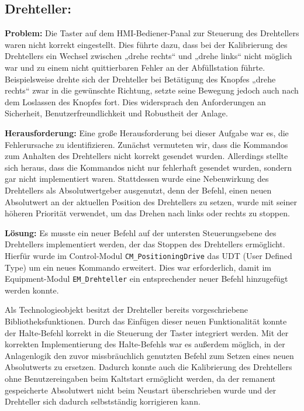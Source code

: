 \subsection{Drehteller:} 

\textbf{Problem:}  
Die Taster auf dem HMI-Bediener-Panal zur Steuerung des Drehtellers waren nicht korrekt eingestellt. Dies führte dazu, dass bei der Kalibrierung des Drehtellers ein 
Wechsel zwischen „drehe rechts“ und „drehe links“ nicht möglich war und zu einem nicht quittierbaren Fehler an der Abfüllstation führte. 
Beispielsweise drehte sich der Drehteller bei Betätigung des Knopfes „drehe rechts“ zwar in die gewünschte Richtung, setzte seine Bewegung 
jedoch auch nach dem Loslassen des Knopfes fort. Dies widersprach den Anforderungen an Sicherheit, Benutzerfreundlichkeit und Robustheit 
der Anlage.  

\textbf{Herausforderung:}  
Eine große Herausforderung bei dieser Aufgabe war es, die Fehlerursache zu identifizieren. Zunächst vermuteten wir, dass die Kommandos zum 
Anhalten des Drehtellers nicht korrekt gesendet wurden. Allerdings stellte sich heraus, dass die Kommandos nicht nur fehlerhaft gesendet wurden, 
sondern gar nicht implementiert waren. Stattdessen wurde eine Nebenwirkung des Drehtellers als Absolutwertgeber ausgenutzt, denn der Befehl, einen 
neuen Absolutwert an der aktuellen Position des Drehtellers zu setzen, wurde mit seiner höheren Priorität verwendet, um das Drehen nach links 
oder rechts zu stoppen.  

\textbf{Lösung:}  
Es musste ein neuer Befehl auf der untersten Steuerungsebene des Drehtellers implementiert werden, der das Stoppen des Drehtellers ermöglicht. 
Hierfür wurde im Control-Modul \texttt{CM\_PositioningDrive} das UDT (User Defined Type) um ein neues Kommando erweitert. Dies war erforderlich, 
damit im Equipment-Modul \texttt{EM\_Drehteller} ein entsprechender neuer Befehl hinzugefügt werden konnte.  

Als Technologieobjekt besitzt der Drehteller bereits vorgeschriebene Bibliotheksfunktionen. Durch das Einfügen dieser neuen Funktionalität konnte der 
Halte-Befehl korrekt in die Steuerung der Taster integriert werden. Mit der korrekten Implementierung des 
Halte-Befehls war es außerdem möglich, in der Anlagenlogik den zuvor missbräuchlich genutzten Befehl zum Setzen eines neuen Absolutwerts zu 
ersetzen. Dadurch konnte auch die Kalibrierung des Drehtellers ohne Benutzereingaben beim Kaltstart ermöglicht werden, da der remanent gespeicherte Absolutwert nicht beim Neustart überschrieben wurde und der Drehteller sich dadurch selbstständig korrigieren kann.  

